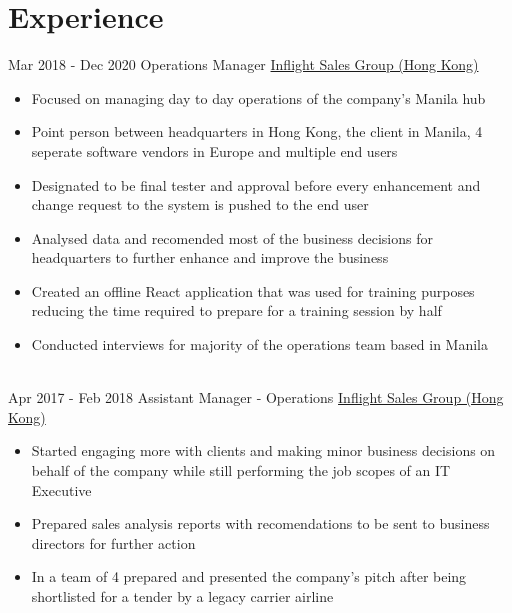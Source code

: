 \documentclass[letterpaper]{twentysecondcv} %
\begin{document}
\makeprofile %


\section{Experience}

\begin{twenty} %
\twentyitem
    	{Mar 2018 -}
		{Dec 2020}
        {Operations Manager}
        {\href{}{Inflight Sales Group (Hong Kong)}}
        {}
        {\begin{itemize}
        \item Focused on managing day to day operations of the company's Manila hub
        \item Point person between headquarters in Hong Kong, the client in Manila, 4 seperate software vendors in Europe and multiple end users
        \item Designated to be final tester and approval before every enhancement and change request to the system is pushed to the end user
        \item Analysed data and recomended most of the business decisions for headquarters to further enhance and improve the business
        \item Created an offline React application that was used for training purposes reducing the time required to prepare for a training session by half
        \item Conducted interviews for majority of the operations team based in Manila
        \end{itemize}}
        \\
	\twentyitem
    	{Apr 2017 -}
		{Feb 2018}
        {Assistant Manager - Operations}
        {\href{}{Inflight Sales Group (Hong Kong)}}
        {}
        {
        {\begin{itemize}
        \item Started engaging more with clients and making minor business decisions on behalf of the company while still performing the job scopes of an IT Executive
        \item Prepared sales analysis reports with recomendations to be sent to business directors for further action 
        \item In a team of 4 prepared and presented the company's pitch after being shortlisted for a tender by a legacy carrier airline

\end{itemize}}}
\end{twenty}
\end{document}
